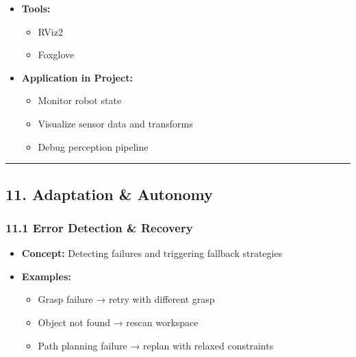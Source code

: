 \documentclass[
]{article}
\providecommand{\tightlist}{%
  \setlength{\itemsep}{0pt}\setlength{\parskip}{0pt}}
\begin{document}
\begin{itemize}
\tightlist
\item
  \textbf{Tools:}

  \begin{itemize}
  \tightlist
  \item
    RViz2
  \item
    Foxglove
  \end{itemize}
\item
  \textbf{Application in Project:}

  \begin{itemize}
  \tightlist
  \item
    Monitor robot state
  \item
    Visualize sensor data and transforms
  \item
    Debug perception pipeline
  \end{itemize}
\end{itemize}

\begin{center}\rule{0.5\linewidth}{0.5pt}\end{center}

\hypertarget{adaptation-autonomy}{%
\subsection{11. Adaptation \& Autonomy}\label{adaptation-autonomy}}

\hypertarget{error-detection-recovery}{%
\subsubsection{11.1 Error Detection \&
Recovery}\label{error-detection-recovery}}

\begin{itemize}
\tightlist
\item
  \textbf{Concept:} Detecting failures and triggering fallback
  strategies
\item
  \textbf{Examples:}

  \begin{itemize}
  \tightlist
  \item
    Grasp failure → retry with different grasp
  \item
    Object not found → rescan workspace
  \item
    Path planning failure → replan with relaxed constraints
  \end{itemize}
\end{itemize}
\end{document}
